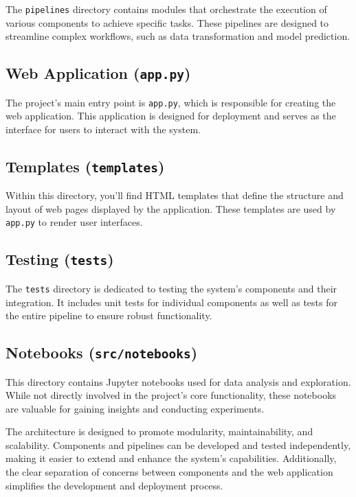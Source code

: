 \documentclass{report}
\begin{document}
The \texttt{pipelines} directory contains modules that orchestrate the execution of various components to achieve specific tasks. These pipelines are designed to streamline complex workflows, such as data transformation and model prediction.

\subsection{Web Application (\texttt{app.py})}

The project's main entry point is \texttt{app.py}, which is responsible for creating the web application. This application is designed for deployment and serves as the interface for users to interact with the system.

\subsection{Templates (\texttt{templates})}

Within this directory, you'll find HTML templates that define the structure and layout of web pages displayed by the application. These templates are used by \texttt{app.py} to render user interfaces.

\subsection{Testing (\texttt{tests})}

The \texttt{tests} directory is dedicated to testing the system's components and their integration. It includes unit tests for individual components as well as tests for the entire pipeline to ensure robust functionality.

\subsection{Notebooks (\texttt{src/notebooks})}

This directory contains Jupyter notebooks used for data analysis and exploration. While not directly involved in the project's core functionality, these notebooks are valuable for gaining insights and conducting experiments.

The architecture is designed to promote modularity, maintainability, and scalability. Components and pipelines can be developed and tested independently, making it easier to extend and enhance the system's capabilities. Additionally, the clear separation of concerns between components and the web application simplifies the development and deployment process.
\end{document}
